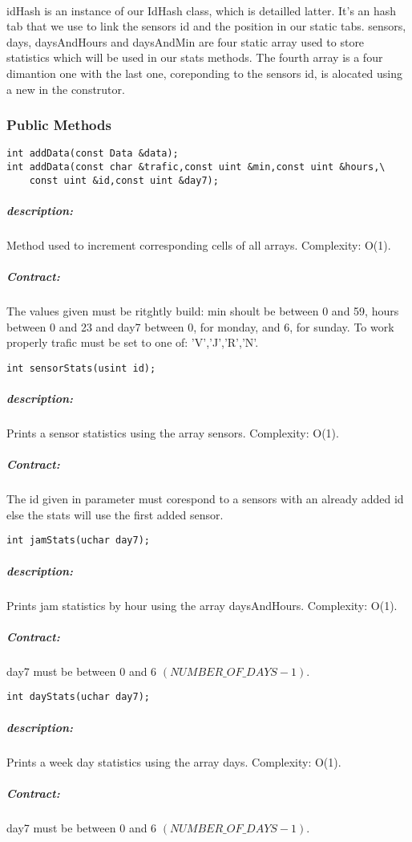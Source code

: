 \documentclass[a4paper, 12pts]{article}
\begin{document}
\paragraph{}
	idHash is an instance of our IdHash class, which is detailled latter. It's an hash tab that we use to link the sensors id and the position in our static tabs.
	sensors, days, daysAndHours and daysAndMin are four static array used to store statistics which will be used in our stats methods. The fourth array is a four dimantion one with the last one, coreponding to the sensors id, is alocated using a new in the construtor.

\subsubsection{Public Methods}

	\begin{lstlisting}
int addData(const Data &data);
int addData(const char &trafic,const uint &min,const uint &hours,\
	const uint &id,const uint &day7);
	\end{lstlisting}
	\subparagraph{description:}
		Method used to increment corresponding cells of all arrays. Complexity: O(1).
	\subparagraph{Contract:}
		The values given must be ritghtly build: min shoult be between 0 and 59, hours between 0 and 23 and day7 between 0, for monday, and 6, for sunday. To work properly trafic must be set to one of: 'V','J','R','N'.

	\begin{lstlisting}
int sensorStats(usint id);
	\end{lstlisting}
	\subparagraph{description:}
		Prints a sensor statistics using the array sensors. Complexity: O(1).
	\subparagraph{Contract:}
		The id given in parameter must corespond to a sensors with an already added id else the stats will use the first added sensor.

	\begin{lstlisting}
int jamStats(uchar day7);
	\end{lstlisting}
	\subparagraph{description:}
		Prints jam statistics by hour using the array daysAndHours. Complexity: O(1).
	\subparagraph{Contract:}
		day7 must be between 0 and 6 $(NUMBER\_OF\_DAYS-1)$.
		
	\begin{lstlisting}
int dayStats(uchar day7);
	\end{lstlisting}
	\subparagraph{description:}
		Prints a week day statistics using the array days. Complexity: O(1).
	\subparagraph{Contract:}
		day7 must be between 0 and 6 $(NUMBER\_OF\_DAYS-1)$.
		
\end{document}
